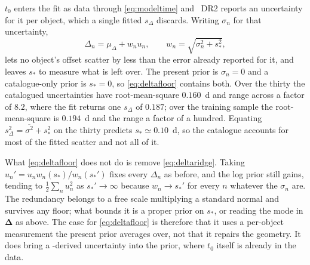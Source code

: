 \documentclass[11pt]{article}
\theoremstyle{plain}
\begin{document}
$t_{0}$ enters the fit as data through \eqref{eq:modeltime} and \ztf\ DR2 reports an
uncertainty for it per object, which a single fitted $s_{\Delta}$ discards. Writing
$\sigma_{n}$ for that uncertainty,
\begin{equation}
  \Delta_{n} = \mu_{\Delta} + w_{n}u_{n} , \qquad
  w_{n} = \sqrt{\sigma_{n}^{2} + s_{*}^{2}} ,
  \label{eq:deltafloor}
\end{equation}
lets no object's offset scatter by less than the error already reported for it, and leaves
$s_{*}$ to measure what is left over. The present prior is $\sigma_{n} = 0$ and a
catalogue-only prior is $s_{*} = 0$, so \eqref{eq:deltafloor} contains both. Over the
thirty the catalogued uncertainties have root-mean-square $0.160$~d and range across a
factor of $8.2$, where the fit returns one $s_{\Delta}$ of $0.187$; over the training
sample the root-mean-square is $0.194$~d and the range a factor of a hundred. Equating
$s_{\Delta}^{2} = \overline{\sigma^{2}} + s_{*}^{2}$ on the thirty predicts
$s_{*} \simeq 0.10$~d, so the catalogue accounts for most of the fitted scatter and not
all of it.

What \eqref{eq:deltafloor} does not do is remove \eqref{eq:deltaridge}. Taking
$u_{n}' = u_{n}w_{n}(s_{*})/w_{n}(s_{*}')$ fixes every $\Delta_{n}$ as before, and the log
prior still gains, tending to $\tfrac{1}{2}\sum_{n}u_{n}^{2}$ as $s_{*}' \to \infty$
because $w_{n} \to s_{*}'$ for every $n$ whatever the $\sigma_{n}$ are. The redundancy
belongs to a free scale multiplying a standard normal and survives any floor; what bounds
it is a proper prior on $s_{*}$, or reading the mode in $\boldsymbol{\Delta}$ as above.
The case for \eqref{eq:deltafloor} is therefore that it uses a per-object measurement the
present prior averages over, not that it repairs the geometry. It does bring a
\salt-derived uncertainty into the prior, where $t_{0}$ itself is already in the data.



\end{document}
